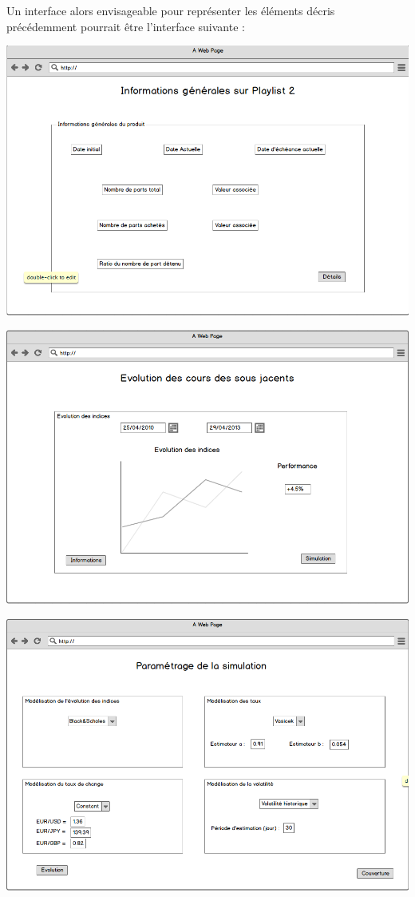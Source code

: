 \documentclass[french,12pt,a4paper]{article}
\begin{document}
 Un interface alors envisageable pour représenter les éléments décris précédemment pourrait être l'interface suivante :\\

\begin{center}
\includegraphics[scale=0.4]{../Maquette_1.png}
\end{center}


\begin{center}
\includegraphics[scale=0.4]{../Maquette_2.png}
\end{center}

\begin{center}
\includegraphics[scale=0.4]{../Maquette_3.png}
\end{center}
\end{document}
